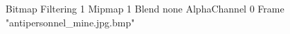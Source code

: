 {Bitmap
	{Filtering 1}
	{Mipmap 1}
	{Blend none}
	{AlphaChannel 0}
	{Frame "antipersonnel_mine.jpg.bmp"}
}

